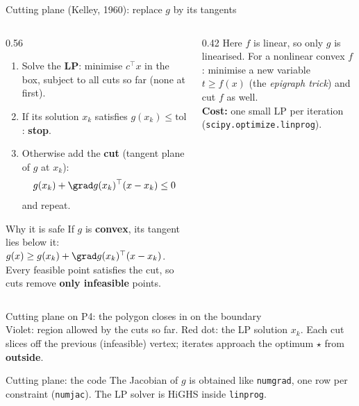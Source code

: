 \begin{frame}{Cutting plane (Kelley, 1960): replace $g$ by its tangents}
  \begin{columns}[T]
    \begin{column}{0.56\textwidth}
      \small
      \begin{enumerate}
        \item Solve the \textbf{LP}: minimise $c^\top x$ in the box, subject to all cuts so far (none at first).
        \item If its solution $x_k$ satisfies $g(x_k)\le\text{tol}$: \textbf{stop}.
        \item Otherwise add the \textbf{cut} (tangent plane of $g$ at $x_k$):
        \[ g(x_k)+\grad g(x_k)^\top(x-x_k)\le0 \]
        and repeat.
      \end{enumerate}
      \begin{alertblock}{Why it is safe}
        If $g$ is \textbf{convex}, its tangent lies below it: $g(x)\ge g(x_k)+\grad g(x_k)^\top(x-x_k)$. Every feasible point satisfies the cut, so cuts remove \textbf{only infeasible} points.
      \end{alertblock}
    \end{column}
    \begin{column}{0.42\textwidth}
      \small
      Here $f$ is linear, so only $g$ is linearised. For a nonlinear convex $f$: minimise a new variable $t\ge f(x)$ (the \emph{epigraph trick}) and cut $f$ as well.\\[6pt]
      \textbf{Cost:} one small LP per iteration (\texttt{scipy.optimize.linprog}).
    \end{column}
  \end{columns}
\end{frame}

\begin{frame}{Cutting plane on P4: the polygon closes in on the boundary}
  \centering
  \\[-1pt]
  \small Violet: region allowed by the cuts so far. Red dot: the LP solution $x_k$. Each cut slices off the previous (infeasible) vertex; iterates approach the optimum $\star$ from \textbf{outside}.
\end{frame}

\begin{frame}{Cutting plane: the code}
  \small The Jacobian of $g$ is obtained like \texttt{numgrad}, one row per constraint (\texttt{numjac}). The LP solver is HiGHS inside \texttt{linprog}.
\end{frame}

